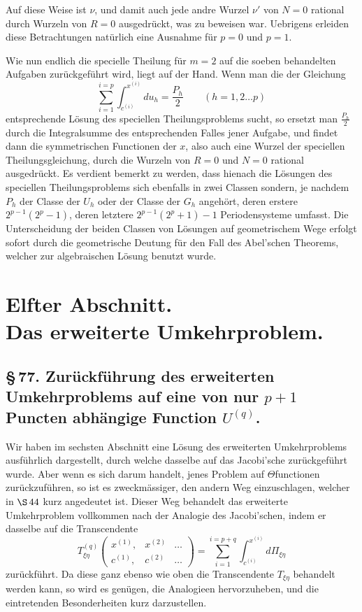 \documentclass[10pt]{article}
\begin{document}
Auf diese Weise ist \(\nu\), und damit auch jede andre Wurzel \(\nu'\) von \(N=0\) rational durch Wurzeln von \(R=0\) ausgedrückt, was zu beweisen war. Uebrigens erleiden diese Betrachtungen natürlich eine Ausnahme für \(p=0\) und \(p=1\).

Wie nun endlich die specielle Theilung für \(m=2\) auf die soeben behandelten Aufgaben zurückgeführt wird, liegt auf der Hand. Wenn man die der Gleichung
\[
\sum_{i=1}^{i=p}\int_{c^{(i)}}^{x^{(i)}}du_h=\frac{P_h}{2}
\qquad (h=1,2\ldots p)
\]
entsprechende Lösung des speciellen Theilungsproblems sucht, so ersetzt man \(\frac{P_h}{2}\) durch die Integralsumme des entsprechenden Falles jener Aufgabe, und findet dann die symmetrischen Functionen der \(x\), also auch eine Wurzel der speciellen Theilungsgleichung, durch die Wurzeln von \(R=0\) und \(N=0\) rational ausgedrückt. Es verdient bemerkt zu werden, dass hienach die Lösungen des speciellen Theilungsproblems sich ebenfalls in zwei Classen sondern, je nachdem \(P_h\) der Classe der \(U_h\) oder der Classe der \(G_h\) angehört, deren erstere \(2^{p-1}(2^p-1)\), deren letztere \(2^{p-1}(2^p+1)-1\) Periodensysteme umfasst. Die Unterscheidung der beiden Classen von Lösungen auf geometrischem Wege erfolgt sofort durch die geometrische Deutung für den Fall des Abel'schen Theorems, welcher zur algebraischen Lösung benutzt wurde.


\section*{Elfter Abschnitt.\\Das erweiterte Umkehrproblem.}

\subsection*{\S\,77. Zurückführung des erweiterten Umkehrproblems auf eine von nur \(p+1\) Puncten abhängige Function \(U^{(q)}\).}

Wir haben im sechsten Abschnitt eine Lösung des erweiterten Umkehrproblems ausführlich dargestellt, durch welche dasselbe auf das Jacobi'sche zurückgeführt wurde. Aber wenn es sich darum handelt, jenes Problem auf \(\Theta\)functionen zurückzuführen, so ist es zweckmässiger, den andern Weg einzuschlagen, welcher in \(\S\,44\) kurz angedeutet ist. Dieser Weg behandelt das erweiterte Umkehrproblem vollkommen nach der Analogie des Jacobi'schen, indem er dasselbe auf die Transcendente
\[
T_{\xi\eta}^{(q)}
\begin{pmatrix}
x^{(1)},&x^{(2)}&\ldots\\
c^{(1)},&c^{(2)}&\ldots
\end{pmatrix}
=\sum_{i=1}^{i=p+q}\int_{c^{(i)}}^{x^{(i)}}d\Pi_{\xi\eta}
\]
zurückführt. Da diese ganz ebenso wie oben die Transcendente \(T_{\xi\eta}\) behandelt werden kann, so wird es genügen, die Analogieen hervorzuheben, und die eintretenden Besonderheiten kurz darzustellen.
\end{document}
